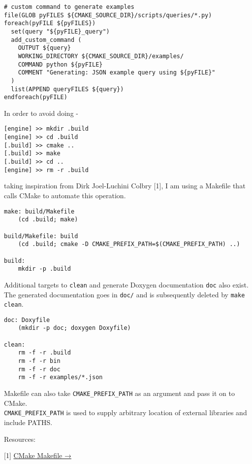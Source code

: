 \begin{lstlisting}
# custom command to generate examples
file(GLOB pyFILES ${CMAKE_SOURCE_DIR}/scripts/queries/*.py)
foreach(pyFILE ${pyFILES})
  set(query "${pyFILE}_query")
  add_custom_command (
    OUTPUT ${query}
    WORKING_DIRECTORY ${CMAKE_SOURCE_DIR}/examples/
    COMMAND python ${pyFILE}
    COMMENT "Generating: JSON example query using ${pyFILE}"
  )
  list(APPEND queryFILES ${query})
endforeach(pyFILE)
\end{lstlisting}

In order to avoid doing -

\begin{lstlisting}
[engine] >> mkdir .build
[engine] >> cd .build
[.build] >> cmake ..
[.build] >> make
[.build] >> cd ..
[engine] >> rm -r .build
\end{lstlisting}

taking inspiration from Dirk Joel-Luchini Colbry {[}1{]}, I am using a
Makefile that calls CMake to automate this operation.

\begin{lstlisting}
make: build/Makefile
    (cd .build; make)

build/Makefile: build
    (cd .build; cmake -D CMAKE_PREFIX_PATH=$(CMAKE_PREFIX_PATH) ..)

build:
    mkdir -p .build
\end{lstlisting}

Additional targets to \lstinline!clean! and generate Doxygen
documentation \lstinline!doc! also exist.\\The generated documentation
goes in \lstinline!doc/! and is subsequently deleted by
\lstinline!make clean!.

\begin{lstlisting}
doc: Doxyfile
    (mkdir -p doc; doxygen Doxyfile)

clean:
    rm -f -r .build
    rm -f -r bin
    rm -f -r doc
    rm -f -r examples/*.json
\end{lstlisting}

Makefile can also take \lstinline!CMAKE_PREFIX_PATH! as an argument and
pass it on to CMake.\\\lstinline!CMAKE_PREFIX_PATH! is used to supply
arbitrary location of external libraries and include PATHS.

Resources:

{[}1{]}
\href{https://wiki.hpcc.msu.edu/display/~colbrydi@msu.edu/2010/08/19/Cmake+Makefile}{CMake
Makefile →}
